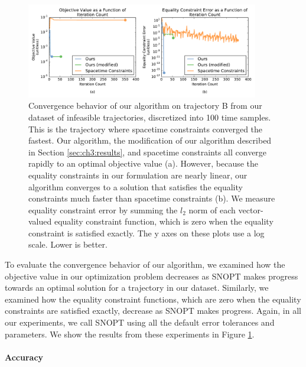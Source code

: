 \begin{figure}[t]
\centering
\includegraphics[width=4.0in]{images/2016_siggraph/01_convergence.pdf}
\caption{
Convergence behavior of our algorithm on trajectory \textsc{B} from our dataset of infeasible trajectories, discretized into 100 time samples.
This is the trajectory where spacetime constraints converged the fastest.
Our algorithm, the modification of our algorithm described in Section \ref{sec:ch3:results}, and spacetime constraints all converge rapidly to an optimal objective value (a).
However, because the equality constraints in our formulation are nearly linear, our algorithm converges to a solution that satisfies the equality constraints much faster than spacetime constraints (b).
We measure equality constraint error by summing the $l_2$ norm of each vector-valued equality constraint function, which is zero when the equality constraint is satisfied exactly. 
The y axes on these plots use a log scale.
Lower is better.
}
\label{fig:ch3:convergence}
\end{figure}

To evaluate the convergence behavior of our algorithm, we examined how the objective value in our optimization problem decreases as SNOPT makes progress towards an optimal solution for a trajectory in our dataset.
Similarly, we examined how the equality constraint functions, which are zero when the equality constraints are satisfied exactly, decrease as SNOPT makes progress.
Again, in all our experiments, we call SNOPT using all the default error tolerances and parameters.
We show the results from these experiments in Figure \ref{fig:ch3:convergence}.

\paragraph{Accuracy}

